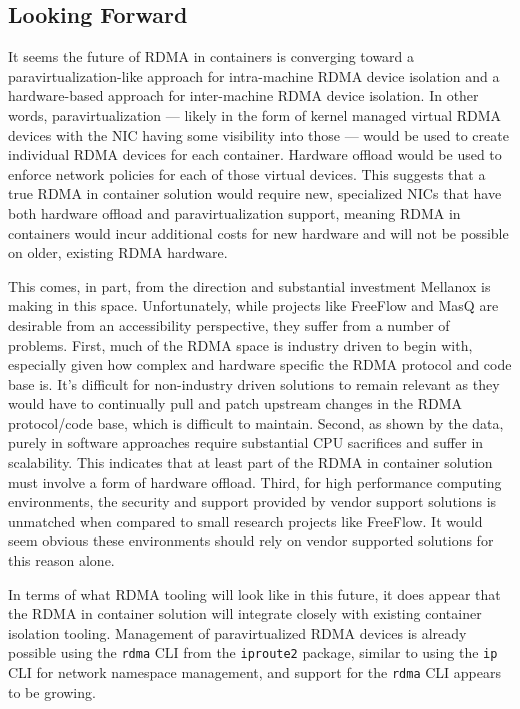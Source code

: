 \documentclass[12pt,titlepage]{article}
\begin{document}
\subsection{Looking Forward}
It seems the future of RDMA in containers is converging toward a paravirtualization-like approach for intra-machine RDMA device isolation and a hardware-based approach for inter-machine RDMA device isolation.
In other words, paravirtualization --- likely in the form of kernel managed virtual RDMA devices with the NIC having some visibility into those --- would be used to create individual RDMA devices for each container.
Hardware offload would be used to enforce network policies for each of those virtual devices. 
This suggests that a true RDMA in container solution would require new, specialized NICs that have both hardware offload and paravirtualization support, meaning RDMA in containers would incur additional costs for new hardware and will not be possible on older, existing RDMA hardware. 

This comes, in part, from the direction and substantial investment Mellanox is making in this space.
Unfortunately, while projects like FreeFlow and MasQ are desirable from an accessibility perspective, they suffer from a number of problems.
First, much of the RDMA space is industry driven to begin with, especially given how complex and hardware specific the RDMA protocol and code base is.
It's difficult for non-industry driven solutions to remain relevant as they would have to continually pull and patch upstream changes in the RDMA protocol/code base, which is difficult to maintain.
Second, as shown by the data, purely in software approaches require substantial CPU sacrifices and suffer in scalability. 
This indicates that at least part of the RDMA in container solution must involve a form of hardware offload.
Third, for high performance computing environments, the security and support provided by vendor support solutions is unmatched when compared to small research projects like FreeFlow. 
It would seem obvious these environments should rely on vendor supported solutions for this reason alone.

In terms of what RDMA tooling will look like in this future, it does appear that the RDMA in container solution will integrate closely with existing container isolation tooling.
Management of paravirtualized RDMA devices is already possible using the \texttt{rdma} CLI from the \texttt{iproute2} package, similar to using the \texttt{ip} CLI for network namespace management, and support for the \texttt{rdma} CLI appears to be growing.
\end{document}
